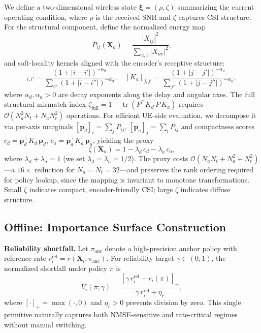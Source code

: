\documentclass[conference]{IEEEtran}
\begin{document}
We define a two-dimensional wireless state $\boldsymbol{\xi}=(\rho,\zeta)$ summarizing the current operating condition, where $\rho$ is the received SNR and $\zeta$ captures CSI structure.
For the structural component, define the normalized energy map
\begin{equation}
P_{ij}(\mathbf{X}_a) = \frac{|X_{ij}|^2}{\sum_{u,v}|X_{uv}|^2},
\label{eq:energy_map}
\end{equation}
and soft-locality kernels aligned with the encoder's receptive structure:
\begin{equation}
[K_d]_{i,i'} = \frac{(1+|i-i'|)^{-\alpha_d}}{\sum_{i''}(1+|i-i''|)^{-\alpha_d}}, \quad
[K_a]_{j,j'} = \frac{(1+|j-j'|)^{-\alpha_a}}{\sum_{j''}(1+|j-j''|)^{-\alpha_a}},
\label{eq:kernels}
\end{equation}
where $\alpha_d,\alpha_a>0$ are decay exponents along the delay and angular axes.
The full structural mismatch index $\zeta_{\mathrm{full}} = 1 - \operatorname{tr}(P^\top K_d\, P\, K_a)$ requires $\mathcal{O}(N_a^2 N_t + N_a N_t^2)$ operations.
For efficient UE-side evaluation, we decompose it via per-axis marginals $[\mathbf{p}_d]_i = \sum_j P_{ij}$, $[\mathbf{p}_a]_j = \sum_i P_{ij}$ and compactness scores $c_d = \mathbf{p}_d^\top K_d\, \mathbf{p}_d$, $c_a = \mathbf{p}_a^\top K_a\, \mathbf{p}_a$, yielding the proxy
\begin{equation}
\zeta(\mathbf{X}_a) = 1 - \lambda_d\, c_d - \lambda_a\, c_a,
\label{eq:struct_state}
\end{equation}
where $\lambda_d + \lambda_a = 1$ (we set $\lambda_d = \lambda_a = 1/2$).
The proxy costs $\mathcal{O}(N_a N_t + N_a^2 + N_t^2)$---a $16\times$ reduction for $N_a = N_t = 32$---and preserves the rank ordering required for policy lookup, since the mapping is invariant to monotone transformations.
Small $\zeta$ indicates compact, encoder-friendly CSI; large $\zeta$ indicates diffuse structure.

\subsection{Offline: Importance Surface Construction}
\label{subsec:offline}

\textbf{Reliability shortfall.}
Let $\pi_{\mathrm{anc}}$ denote a high-precision anchor policy with reference rate $r_i^{\mathrm{ref}}=r(\mathbf{X}_i;\pi_{\mathrm{anc}})$.
For reliability target $\gamma\in(0,1)$, the normalized shortfall under policy $\pi$ is
\begin{equation}
V_i(\pi;\gamma) = \frac{[\gamma\, r_i^{\mathrm{ref}} - r_i(\pi)]_+}{\gamma\, r_i^{\mathrm{ref}} + \eta_r},
\label{eq:shortfall}
\end{equation}
where $[\cdot]_+=\max(\cdot,0)$ and $\eta_r>0$ prevents division by zero.
This single primitive naturally captures both NMSE-sensitive and rate-critical regimes without manual switching.
\end{document}
